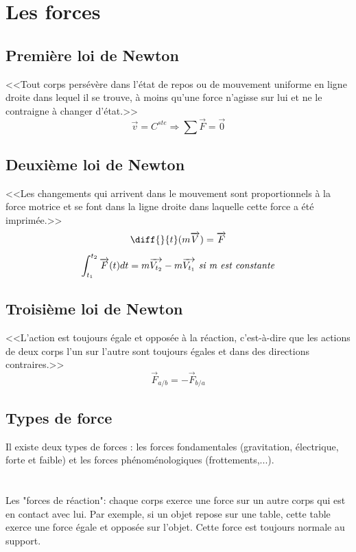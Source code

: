 \documentclass[a4paper,10pt]{book} %
\begin{document}
\newpage

\section{Les forces}
\subsection{Première loi de Newton}
<<Tout corps persévère dans l’état de repos ou de mouvement uniforme en ligne droite dans lequel il se trouve, à moins qu’une force n’agisse sur lui et ne le contraigne à changer d’état.>>
$$\overrightarrow{v}=C^{ste}\Rightarrow \sum\overrightarrow{F}=\overrightarrow{0}$$

\subsection{Deuxième loi de Newton}
<<Les changements qui arrivent dans le mouvement sont proportionnels à la force motrice et se font dans la ligne droite dans laquelle cette force a été imprimée.>>
$$\diff{}{t}(m\overrightarrow{V})=\overrightarrow{F}$$
$$\int_{t_1}^{t_2}\overrightarrow{F}(t)dt=m\overrightarrow{V_{t_2}}-m\overrightarrow{V_{t_1}}\text{\textit{ si m est constante}}$$

\subsection{Troisième loi de Newton}
<<L'action est toujours égale et opposée à la réaction, c'est-à-dire que les actions de deux corps l'un sur l'autre sont toujours égales et dans des directions contraires.>>
$$\overrightarrow{F}_{a/b}=-\overrightarrow{F}_{b/a}$$

\subsection{Types de force}
Il existe deux types de forces : les forces fondamentales (gravitation, électrique, forte et faible) et les forces phénoménologiques (frottements,...).\\\\\\


Les "forces de réaction": chaque corps exerce une force sur un autre corps qui est en contact avec lui. Par exemple, si un objet repose sur une table, cette table exerce une force égale et opposée sur l'objet. Cette force est toujours normale au support.\\
\end{document}
